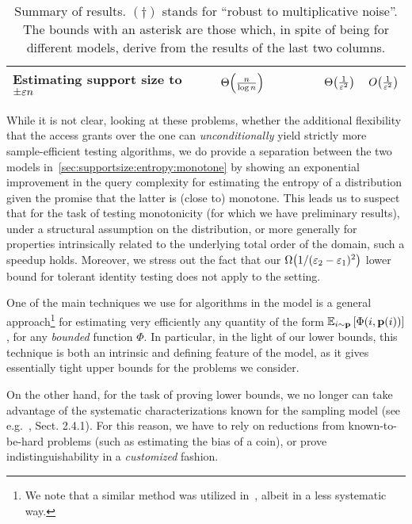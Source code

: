 \begin{table}[h]
\begin{adjustwidth}{-0.5in}{0.4in}
\begin{tabular}{|l|c|c|c||c|c|}
    \parbox{25mm}{ Estimating support size to $\pm\varepsilon n$ \strut } & $\bigTheta{\frac{n}{\log n}}$~\cite{ValiantValiant:11,ValiantValiant:10lb} & ~  & ~        & $\bigTheta{\frac{1}{\eps^{2}}}$             & $\bigO{\frac{1}{\eps^{2}}}$           \\ \hline
    \end{tabular}
\end{adjustwidth}
    \caption{\label{table:secextended:results}\small Summary of results. $(\dagger)$ stands for ``robust to multiplicative noise''. The bounds with an asterisk are those which, in spite of being for different models, derive from the results of the last two columns.}
\end{table}
 
While it is not clear, looking at these problems, whether the additional flexibility that the \Cdfsamp access grants over the \Pdfsamp one can \emph{unconditionally} yield strictly more sample-efficient testing algorithms, we do provide a separation between the two models in~\cref{sec:supportsize:entropy:monotone} by showing an exponential improvement in the query complexity for estimating the entropy of a distribution given the promise that the latter is (close to) monotone. This leads us to suspect that for the task of testing monotonicity (for which we have preliminary results), under a structural assumption on the distribution, or more generally for properties intrinsically related to the underlying total order of the domain, such a speedup holds.  Moreover, we stress out the fact that our $\bigOmega{1/(\eps_2-\eps_1)^2}$ lower bound for tolerant identity testing does not apply to the \Cdfsamp setting.

One of the main techniques we use for algorithms in the \pdfsamp model is a general approach\footnote{We note that a similar method was utilized in~\cite{BDKR:05}, albeit in a less systematic way.}{} for estimating very efficiently any quantity of the form
$\mathbb{E}_{i\sim \mathbf{p}}\left[ \Phi(i,\mathbf{p}(i)) \right]$, for any \emph{bounded} function $\Phi$. In particular, in the light of our lower bounds, this technique is both an intrinsic and defining feature of the \Pdfsamp model, as it gives essentially tight upper bounds for the problems we consider.

On the other hand, for the task of proving lower bounds, we no longer can take advantage of the systematic characterizations known for the sampling model  (see e.g.~\cite{BarYossef:02}, Sect. 2.4.1). For this reason, we have to rely on reductions from known-to-be-hard problems (such as estimating the bias of a coin), or prove indistinguishability in a \emph{customized} fashion.
  
